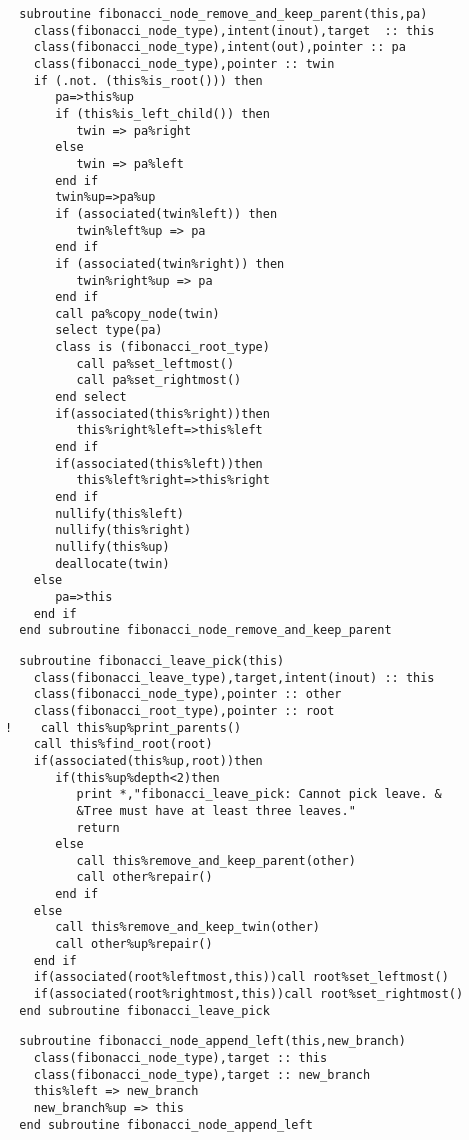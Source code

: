 \begin{Verbatim}
  subroutine fibonacci_node_remove_and_keep_parent(this,pa)
    class(fibonacci_node_type),intent(inout),target  :: this
    class(fibonacci_node_type),intent(out),pointer :: pa
    class(fibonacci_node_type),pointer :: twin
    if (.not. (this%is_root())) then
       pa=>this%up
       if (this%is_left_child()) then         
          twin => pa%right
       else
          twin => pa%left
       end if
       twin%up=>pa%up
       if (associated(twin%left)) then
          twin%left%up => pa
       end if
       if (associated(twin%right)) then
          twin%right%up => pa
       end if
       call pa%copy_node(twin)
       select type(pa)
       class is (fibonacci_root_type)
          call pa%set_leftmost()
          call pa%set_rightmost()
       end select
       if(associated(this%right))then
          this%right%left=>this%left
       end if
       if(associated(this%left))then
          this%left%right=>this%right
       end if
       nullify(this%left)
       nullify(this%right)
       nullify(this%up)
       deallocate(twin)
    else
       pa=>this
    end if
  end subroutine fibonacci_node_remove_and_keep_parent
\end{Verbatim}

\begin{Verbatim}
  subroutine fibonacci_leave_pick(this)
    class(fibonacci_leave_type),target,intent(inout) :: this
    class(fibonacci_node_type),pointer :: other
    class(fibonacci_root_type),pointer :: root
!    call this%up%print_parents()
    call this%find_root(root)
    if(associated(this%up,root))then
       if(this%up%depth<2)then
          print *,"fibonacci_leave_pick: Cannot pick leave. &
          &Tree must have at least three leaves."
          return
       else
          call this%remove_and_keep_parent(other)
          call other%repair()
       end if
    else
       call this%remove_and_keep_twin(other)
       call other%up%repair()
    end if
    if(associated(root%leftmost,this))call root%set_leftmost()
    if(associated(root%rightmost,this))call root%set_rightmost()
  end subroutine fibonacci_leave_pick
\end{Verbatim}

\begin{Verbatim}
  subroutine fibonacci_node_append_left(this,new_branch)
    class(fibonacci_node_type),target :: this
    class(fibonacci_node_type),target :: new_branch
    this%left => new_branch
    new_branch%up => this
  end subroutine fibonacci_node_append_left
\end{Verbatim}
  

